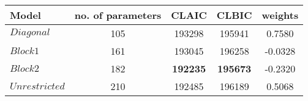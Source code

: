 \begin{tabular} 
 {l    *{4}{c} } 
Model & no. of parameters  & CLAIC & CLBIC &weights  \\  \hline \hline
$Diagonal$ &        105  &     193298 &     195941 & 0.7580 \\ 
$Block1$ &        161  &     193045 &     196258& -0.0328 \\ 
$Block2$ &        182  & \textbf{    192235} &     \textbf{195673} & -0.2320 \\ 
$Unrestricted$ &        210  &     192485 &     196189& 0.5068 \\ 
\hline \hline
 \end{tabular} 
